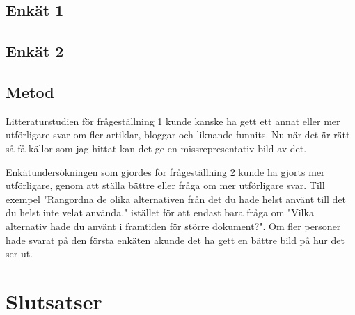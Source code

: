 \subsection{Enkät 1}

\subsection{Enkät 2}


\subsection{Metod}
Litteraturstudien för frågeställning 1 kunde kanske ha gett ett annat eller mer utförligare svar om fler artiklar, bloggar och liknande funnits. Nu när det är rätt så få källor som jag hittat kan det ge en missrepresentativ bild av det.

Enkätundersökningen som gjordes för frågeställning 2 kunde ha gjorts mer utförligare, genom att ställa bättre eller fråga om mer utförligare svar. Till exempel "Rangordna de olika alternativen från det du hade helst använt till det du helst inte velat använda." istället för att endast bara fråga om "Vilka alternativ hade du använt i framtiden för större dokument?". Om fler personer hade svarat på den första enkäten akunde det ha gett en bättre bild på hur det ser ut.

\section{Slutsatser}
\label{sec:conclusions-tuhkala}




